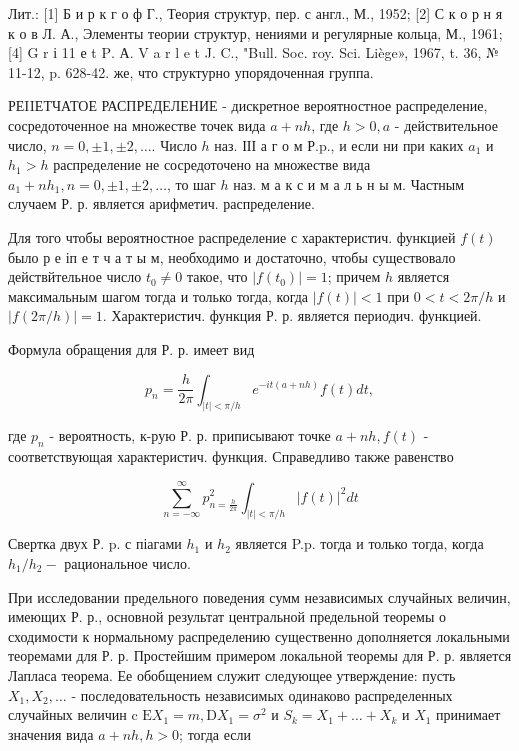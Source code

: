 \documentclass[10pt]{article}
\begin{document}
Лит.: [1] Б и р к г о ф Г., Теория структур, пер. с англ., М., 1952; [2] С к о р н я к о в Л. А., Элементы теории структур, нениями и регулярные кольца, М., 1961; [4] G r і 11 е t $\mathrm{P}$. А. V a r l e t J. C., "Bull. Soc. roy. Sci. Liège», 1967, t. 36, № 11-12, p. 628-42. же, что структурно упорядоченная группа.



РЕIIЕТЧАТОЕ РАСПРЕДЕЛЕНИЕ - дискретное вероятностное распределение, сосредоточенное на множестве точек вида $a+n h$, где $h>0, a$ - действительное число, $n=0, \pm 1, \pm 2, \ldots$. Число $h$ наз. ІІІ а г о м Р.p., и если ни при каких $a_{1}$ и $h_{1}>h$ распределение не сосредоточено на множестве вида $a_{1}+n h_{1}, n=0, \pm 1, \pm 2, \ldots$, то шаг $h$ наз. м а к с и м а л ь н ы м. Частным случаем Р. р. является арифметич. распределение.



Для того чтобы вероятностное распределение с характеристич. функцией $f(t)$ было р е іп е т ч а т ы м, необходимо и достаточно, чтобы существовало действйтельное число $t_{0} \neq 0$ такое, что $\left|f\left(t_{0}\right)\right|=1$; причем $h$ является максимальным шагом тогда и только тогда, когда $|f(t)|<1$ при $0<t<2 \pi / h$ и $|f(2 \pi / h)|=1$. Характеристич. функция Р. р. является периодич. функцией.



Формула обращения для Р. р. имеет вид



\[

p_{n}=\frac{h}{2 \pi} \int_{|t|<\pi / h} e^{-i t(a+n h)} f(t) d t,

\]



где $p_{n}$ - вероятность, к-рую Р. р. приписывают точке $a+n h, f(t)$ - соответствующая характеристич. функция. Справедливо также равенство



\[

\sum_{n=-\infty}^{\infty} p_{n=\frac{h}{2 \pi}}^{2} \int_{|t|<\pi / h}|f(t)|^{2} d t

\]



Свертка двух Р. p. с піагами $h_{1}$ и $h_{2}$ является P.p. тогда и только тогда, когда $h_{1} / h_{2}-$ рациональное число.



При исследовании предельного поведения сумм независимых случайных величин, имеющих Р. р., основной результат центральной предельной теоремы о сходимости к нормальному распределению существенно дополняется локальными теоремами для Р. р. Простейшим примером локальной теоремы для Р. р. является Лапласа теорема. Ее обобщением служит следующее утверждение: пусть $X_{1}, X_{2}, \ldots$ - последовательность независимых одинаково распределенных случайных величин c $\mathrm{E} X_{1}=m, \mathrm{D} X_{1}=\sigma^{2}$ и $S_{k}=X_{1}+\ldots+X_{k}$ и $X_{1}$ принимает значения вида $a+n h, h>0$; тогда если
\end{document}
